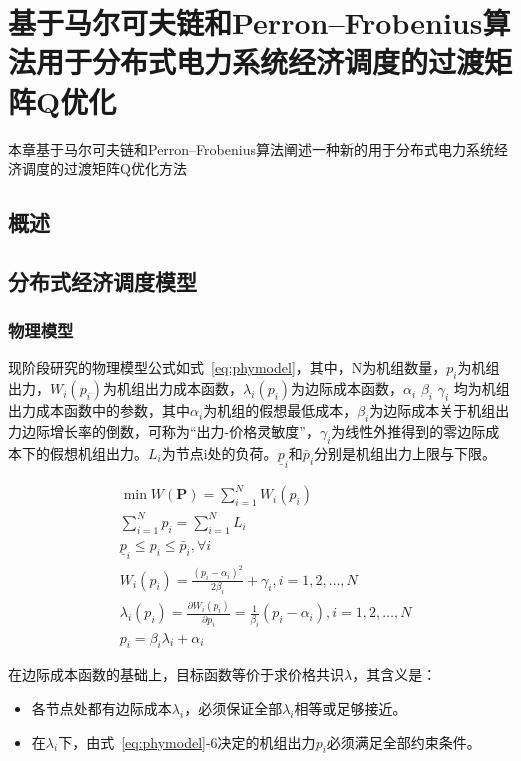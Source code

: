 \chapter{基于马尔可夫链和Perron–Frobenius算法用于分布式电力系统经济调度的过渡矩阵Q优化}
\label{cha:Algorithm}

本章基于马尔可夫链和Perron–Frobenius算法阐述一种新的用于分布式电力系统经济调度的过渡矩阵Q优化方法

\section{概述}


\section{分布式经济调度模型}

\subsection{物理模型}

现阶段研究的物理模型公式如式~\ref{eq:phymodel}，其中，N为机组数量，$p_{i}$为机组出力，$W_{i}\left(p_{i}\right)$为机组出力成本函数，$\lambda_{i}\left(p_{i}\right)$为边际成本函数，$\alpha_{i}$ $\beta_{i}$ $\gamma_{i}$ 均为机组出力成本函数中的参数，其中$\alpha_{i}$为机组的假想最低成本，$\beta_{i}$为边际成本关于机组出力边际增长率的倒数，可称为“出力-价格灵敏度”，$\gamma_{i}$为线性外推得到的零边际成本下的假想机组出力。$L_{i}$为节点i处的负荷。$\underline{p}_{i}$和$\bar{p}_{i}$分别是机组出力上限与下限。

\begin{equation}
    \begin{aligned}
    &\min W(\mathbf{P})=\sum_{i=1}^{N} W_{i}\left(p_{i}\right)\\
    &\sum_{i=1}^{N} p_{i}=\sum_{i=1}^{N} L_{i}\\
    &\underline{p}_{i} \leq p_{i} \leq \bar{p}_{i}, \forall i\\
    &W_{i}\left(p_{i}\right)=\frac{\left(p_{i}-\alpha_{i}\right)^{2}}{2 \beta_{i}}+\gamma_{i}, i=1,2, \ldots, N\\
    &\lambda_{i}\left(p_{i}\right)=\frac{\partial W_{i}\left(p_{i}\right)}{\partial p_{i}}=\frac{1}{\beta_{i}}\left(p_{i}-\alpha_{i}\right), i=1,2, \ldots, N\\
    &p_{i}=\beta_{i} \lambda_{i}+\alpha_{i}
    \end{aligned}
    \label{eq:phymodel} 
\end{equation}

在边际成本函数的基础上，目标函数等价于求价格共识$\lambda$，其含义是：

\begin{itemize}
    \item 各节点处都有边际成本$\lambda_{i}$，必须保证全部$\lambda_{i}$相等或足够接近。
    \item 在$\lambda_{i}$下，由式~\ref{eq:phymodel}-6决定的机组出力$p_{i}$必须满足全部约束条件。
\end{itemize}


